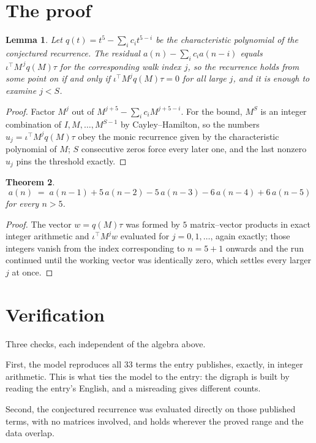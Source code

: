 \documentclass[11pt,a4paper]{article}
\theoremstyle{plain}
\newtheorem{theorem}{Theorem}
\newtheorem{lemma}[theorem]{Lemma}
\theoremstyle{definition}
\begin{document}
\section{The proof}

\begin{lemma}\label{lem:crit}
Let $q(t)=t^{5}-\sum_i c_it^{5-i}$ be the characteristic polynomial of the
conjectured recurrence. The residual $a(n)-\sum_ic_ia(n-i)$ equals
$\iota^{\!\top}M^{\,j}q(M)\tau$ for the corresponding walk index $j$, so the recurrence
holds from some point on if and only if $\iota^{\!\top}M^{j}q(M)\tau=0$ for all large $j$,
and it is enough to examine $j<S$.
\end{lemma}

\begin{proof}
Factor $M^{j}$ out of $M^{j+5}-\sum_ic_iM^{j+5-i}$. For the bound, $M^{S}$
is an integer combination of $I,M,\dots,M^{S-1}$ by Cayley--Hamilton, so the numbers
$u_j=\iota^{\!\top}M^{j}q(M)\tau$ obey the monic recurrence given by the characteristic
polynomial of $M$; $S$ consecutive zeros force every later one, and the last nonzero $u_j$
pins the threshold exactly.
\end{proof}

\begin{theorem}
\[
a(n)\;=\;a(n-1) + 5\,a(n-2) - 5\,a(n-3) - 6\,a(n-4) + 6\,a(n-5)
\]
for every $n>5$.
\end{theorem}

\begin{proof}
The vector $w=q(M)\tau$ was formed by $5$ matrix--vector products in exact integer
arithmetic and $\iota^{\!\top}M^{j}w$ evaluated for $j=0,1,\dots$, again exactly; those
integers vanish from the index corresponding to $n=5+1$ onwards and the run continued
until the working vector was identically zero, which settles every larger $j$ at once.
\end{proof}

\section{Verification}

Three checks, each independent of the algebra above.

First, the model reproduces all $33$ terms the entry publishes, exactly, in integer
arithmetic. This is what ties the model to the entry: the digraph is built by reading the
entry's English, and a misreading gives different counts.

Second, the conjectured recurrence was evaluated directly on those published terms, with no
matrices involved, and holds wherever the proved range and the data overlap.
\end{document}
